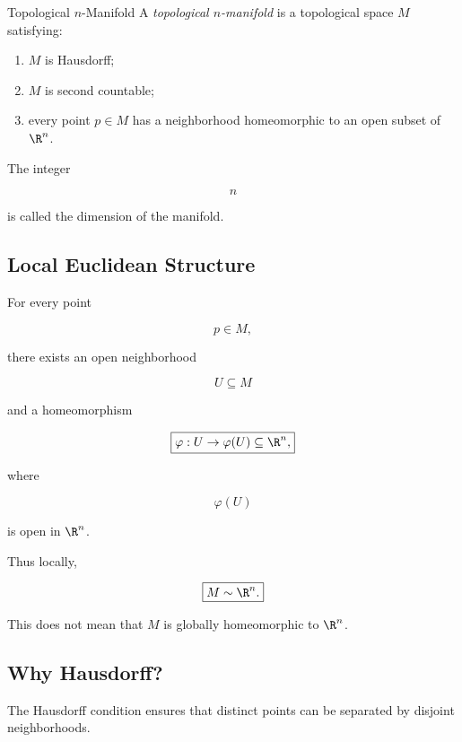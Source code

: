 \begin{definitionbox}{Topological \(n\)-Manifold}
A \emph{topological \(n\)-manifold} is a topological space \(M\) satisfying:

\begin{enumerate}
    \item \(M\) is Hausdorff;
    \item \(M\) is second countable;
    \item every point \(p\in M\) has a neighborhood homeomorphic to an open
    subset of \(\R^n\).
\end{enumerate}
\end{definitionbox}

The integer

\[
\boxed{
n
}
\]

is called the dimension of the manifold.

\subsection{Local Euclidean Structure}
\label{subsec:local-euclidean-structure}

For every point

\[
p\in M,
\]

there exists an open neighborhood

\[
U\subseteq M
\]

and a homeomorphism

\[
\boxed{
\varphi:U\to\varphi(U)\subseteq\R^n,
}
\]

where

\[
\varphi(U)
\]

is open in \(\R^n\).

Thus locally,

\[
\boxed{
M\sim\R^n.
}
\]

This does not mean that \(M\) is globally homeomorphic to \(\R^n\).

\subsection{Why Hausdorff?}
\label{subsec:why-hausdorff-manifolds}

The Hausdorff condition ensures that distinct points can be separated by
disjoint neighborhoods.


